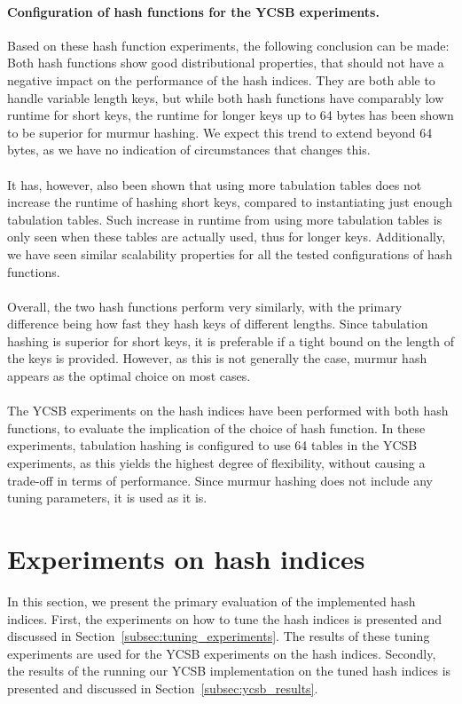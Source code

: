 \documentclass[11pt]{report} %
\begin{document}
\paragraph{Configuration of hash functions for the YCSB experiments.} Based on these hash function experiments, the following conclusion can be made: Both hash functions show good distributional properties, that should not have a negative impact on the performance of the hash indices. They are both able to handle variable length keys, but while both hash functions have comparably low runtime for short keys, the runtime for longer keys up to 64 bytes has been shown to be superior for murmur hashing. We expect this trend to extend beyond 64 bytes, as we have no indication of circumstances that changes this. \\
\\
It has, however, also been shown that using more tabulation tables does not increase the runtime of hashing short keys, compared to instantiating just enough tabulation tables. Such increase in runtime from using more tabulation tables is only seen when these tables are actually used, thus for longer keys. Additionally, we have seen similar scalability properties for all the tested configurations of hash functions. \\
\\
Overall, the two hash functions perform very similarly, with the primary difference being how fast they hash keys of different lengths. Since tabulation hashing is superior for short keys, it is preferable if a tight bound on the length of the keys is provided. However, as this is not generally the case, murmur hash appears as the optimal choice on most cases.\\
\\
The YCSB experiments on the hash indices have been performed with both hash functions, to evaluate the implication of the choice of hash function. In these experiments, tabulation hashing is configured to use 64 tables in the YCSB experiments, as this yields the highest degree of flexibility, without causing a trade-off in terms of performance. Since murmur hashing does not include any tuning parameters, it is used as it is.
\section{Experiments on hash indices}
\label{sec:hash_index_experiments}
In this section, we present the primary evaluation of the implemented hash indices. First, the experiments on how to tune the hash indices is presented and discussed in Section~\ref{subsec:tuning_experiments}. The results of these tuning experiments are used for the YCSB experiments on the hash indices. Secondly, the results of the running our YCSB implementation on the tuned hash indices is presented and discussed in Section~\ref{subsec:ycsb_results}.
\end{document}
